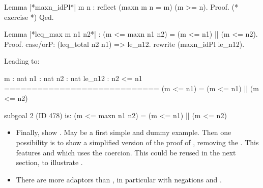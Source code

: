 \begin{coq}{}{}
Lemma |*maxn_idPl*| {m n} : reflect (maxn m n = m) (m >= n).
Proof. (* exercise *) Qed.

Lemma |*leq_max m n1 n2*| :
  (m <= maxn n1 n2) = (m <= n1) || (m <= n2).
Proof.
case/orP: (leq_total n2 n1) => le_n12. rewrite (maxn_idPl le_n12).
\end{coq}

Leading to:

\begin{coqout}{}{}

  m : nat
  n1 : nat
  n2 : nat
  le_n12 : n2 <= n1
  ============================
   (m <= n1) = (m <= n1) || (m <= n2)

subgoal 2 (ID 478) is:
 (m <= maxn n1 n2) = (m <= n1) || (m <= n2)
\end{coqout}

\begin{itemize}





\item Finally, show . May be a first
  simple and dummy example. Then one possibility is
  to show a simplified version of the proof of , removing
  the . This features 
  and  which uses the  coercion.
  This could be reused in the next section, to illustrate .


\item There are more adaptors than ,
  in particular with negations  and .

\end{itemize}

